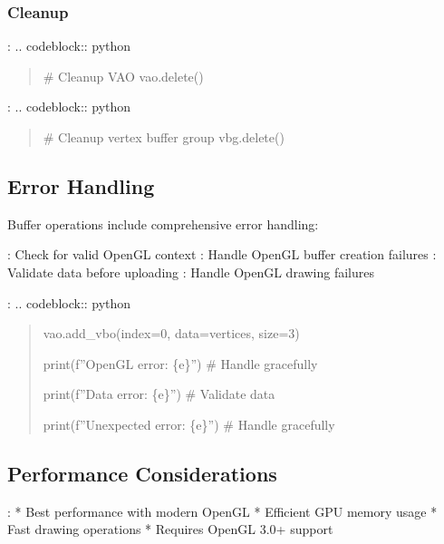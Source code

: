 \documentclass[a4paper,10pt,english,openany,oneside]{sphinxmanual}
\begin{document}
\subsubsection{Cleanup}
\label{\detokenize{api/buffers:cleanup}}
\sphinxAtStartPar
{}:
.. code\sphinxhyphen{}block:: python
\begin{quote}

\sphinxAtStartPar
\# Cleanup VAO
vao.delete()
\end{quote}

\sphinxAtStartPar
{}:
.. code\sphinxhyphen{}block:: python
\begin{quote}

\sphinxAtStartPar
\# Cleanup vertex buffer group
vbg.delete()
\end{quote}


\subsection{Error Handling}
\label{\detokenize{api/buffers:error-handling}}
\sphinxAtStartPar
Buffer operations include comprehensive error handling:

\sphinxAtStartPar
{}: Check for valid OpenGL context
: Handle OpenGL buffer creation failures
: Validate data before uploading
: Handle OpenGL drawing failures

\sphinxAtStartPar
{}:
.. code\sphinxhyphen{}block:: python
\begin{quote}
\begin{description}
\sphinxAtStartPar
vao.add\_vbo(index=0, data=vertices, size=3)

\sphinxAtStartPar
print(f”OpenGL error: \{e\}”)
\# Handle gracefully

\sphinxAtStartPar
print(f”Data error: \{e\}”)
\# Validate data

\sphinxAtStartPar
print(f”Unexpected error: \{e\}”)
\# Handle gracefully

\end{description}
\end{quote}


\subsection{Performance Considerations}
\label{\detokenize{api/buffers:performance-considerations}}
\sphinxAtStartPar
{}:
* Best performance with modern OpenGL
* Efficient GPU memory usage
* Fast drawing operations
* Requires OpenGL 3.0+ support
\end{document}
